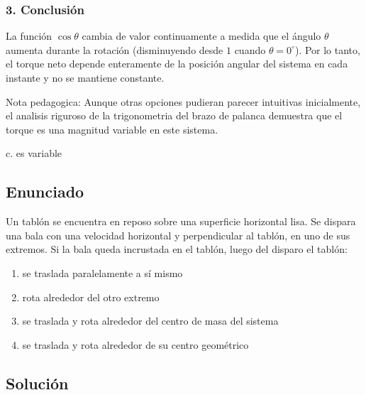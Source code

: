 \documentclass[12pt, a4paper]{article}
\begin{document}
\subsubsection*{3. Conclusión}
La función $\cos\theta$ cambia de valor continuamente a medida que el ángulo $\theta$ aumenta durante la rotación (disminuyendo desde $1$ cuando $\theta=0^\circ$). Por lo tanto, el torque neto depende enteramente de la posición angular del sistema en cada instante y no se mantiene constante. 

Nota pedagogica: Aunque otras opciones pudieran parecer intuitivas inicialmente, el analisis riguroso de la trigonometria del brazo de palanca demuestra que el torque es una magnitud variable en este sistema.

\begin{tcolorbox}[colback=green!5!white, colframe=green!50!black, title=Respuesta Correcta]
\centering \Large c. es variable
\end{tcolorbox}

\newpage

\subsection*{Enunciado}
Un tablón se encuentra en reposo sobre una superficie horizontal lisa. Se dispara una bala con una velocidad horizontal y perpendicular al tablón, en uno de sus extremos. Si la bala queda incrustada en el tablón, luego del disparo el tablón:
\begin{enumerate}[label=\alph*.]
    \item se traslada paralelamente a sí mismo
    \item rota alrededor del otro extremo
    \item se traslada y rota alrededor del centro de masa del sistema
    \item se traslada y rota alrededor de su centro geométrico
\end{enumerate}

\subsection*{Solución}
\end{document}
